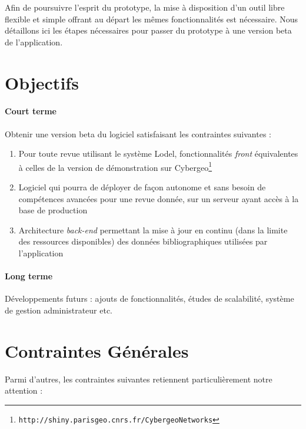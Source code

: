 \documentclass[11pt]{article}
\begin{document}
Afin de poursuivre l'esprit du prototype, la mise à disposition d'un outil libre flexible et simple offrant au départ les mêmes fonctionnalités est nécessaire. Nous détaillons ici les étapes nécessaires pour passer du prototype à une version beta de l'application.







\section{Objectifs}

\paragraph{Court terme}

Obtenir une version beta du logiciel satisfaisant les contraintes suivantes :

\begin{enumerate}
\item Pour toute revue utilisant le système Lodel, fonctionnalités \emph{front} équivalentes à celles de la version de démonstration sur Cybergeo\footnote{\texttt{http://shiny.parisgeo.cnrs.fr/CybergeoNetworks}}
\item Logiciel qui pourra de déployer de façon autonome et sans besoin de compétences avancées pour une revue donnée, sur un serveur ayant accès à la base de production
\item Architecture \emph{back-end} permettant la mise à jour en continu (dans la limite des ressources disponibles) des données bibliographiques utilisées par l'application
\end{enumerate}


\paragraph{Long terme}

Développements futurs : ajouts de fonctionnalités, études de scalabilité, système de gestion administrateur etc.



\section{Contraintes Générales}

Parmi d'autres, les contraintes suivantes retiennent particulièrement notre attention :
\end{document}
